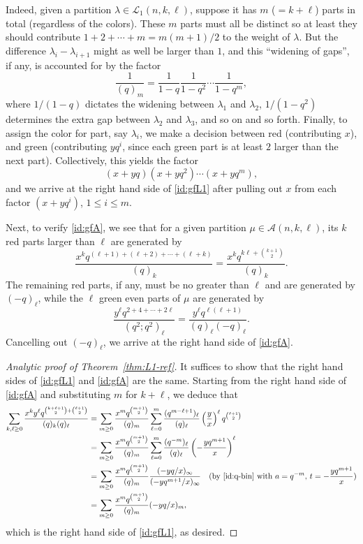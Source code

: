 \documentclass[11pt,reqno]{amsart}
\numberwithin{equation}{section}
\theoremstyle{plain}
\theoremstyle{definition}
\newcommand{\A}{\mathcal{A}}
\renewcommand{\L}{\mathcal{L}}
\begin{document}
Indeed, given a partition $\lambda\in\L_1(n,k,\ell)$, suppose it has $m$ ($=k+\ell$) parts in total (regardless of the colors). These $m$ parts must all be distinct so at least they should contribute $1+2+\cdots+m=m(m+1)/2$ to the weight of $\lambda$. But the difference $\lambda_i-\lambda_{i+1}$ might as well be larger than $1$, and this ``widening of gaps'', if any, is accounted for by the factor
$$\frac{1}{(q)_m}=\frac{1}{1-q}\frac{1}{1-q^2}\cdots\frac{1}{1-q^m},$$
where $1/(1-q)$ dictates the widening between $\lambda_1$ and $\lambda_2$, $1/(1-q^2)$ determines the extra gap between $\lambda_2$ and $\lambda_3$, and so on and so forth. Finally, to assign the color for part, say $\lambda_i$, we make a decision between red (contributing $x$), and green (contributing $yq^i$, since each green part is at least $2$ larger than the next part). Collectively, this yields the factor
$$(x+yq)(x+yq^2)\cdots(x+yq^m),$$
and we arrive at the right hand side of \eqref{id:gfL1} after pulling out $x$ from each factor $(x+yq^i)$, $1\le i\le m$.

Next, to verify \eqref{id:gfA}, we see that for a given partition $\mu\in\A(n,k,\ell)$, its $k$ red parts larger than $\ell$ are generated by
$$\frac{x^kq^{(\ell+1)+(\ell+2)+\cdots+(\ell+k)}}{(q)_k}=\frac{x^kq^{k\ell+\binom{k+1}{2}}}{(q)_k}.$$
The remaining red parts, if any, must be no greater than $\ell$ and are generated by $(-q)_{\ell}$, while the $\ell$ green even parts of $\mu$ are generated by
$$\frac{y^{\ell}q^{2+4+\cdots+2\ell}}{(q^2;q^2)_{\ell}}=\frac{y^{\ell}q^{\ell(\ell+1)}}{(q)_{\ell}(-q)_{\ell}}.$$
Cancelling out $(-q)_{\ell}$, we arrive at the right hand side of \eqref{id:gfA}.

\begin{proof}[Analytic proof of Theorem~\ref{thm:L1-ref}]
It suffices to show that the right hand sides of \eqref{id:gfL1} and \eqref{id:gfA} are the same. Starting from the right hand side of \eqref{id:gfA} and substituting $m$ for $k+\ell$, we deduce that
\begin{align*}
\sum_{k,\ell\ge 0}\frac{x^k y^{\ell}q^{\binom{k+\ell+1}{2}+\binom{\ell+1}{2}}}{(q)_k(q)_{\ell}} &= \sum_{m\ge 0}\frac{x^mq^{\binom{m+1}{2}}}{(q)_m}\sum_{\ell=0}^{m}\frac{(q^{m-\ell+1})_{\ell}}{(q)_{\ell}}\left(\frac{y}{x}\right)^{\ell}q^{\binom{\ell+1}{2}}\\
&= \sum_{m\ge 0}\frac{x^mq^{\binom{m+1}{2}}}{(q)_m}\sum_{\ell=0}^m \frac{(q^{-m})_{\ell}}{(q)_{\ell}}\left(-\frac{yq^{m+1}}{x}\right)^{\ell}\\
&= \sum_{m\ge 0}\frac{x^mq^{\binom{m+1}{2}}}{(q)_m}\frac{(-yq/x)_{\infty}}{(-yq^{m+1}/x)_{\infty}}\quad \text{(by \eqref{id:q-bin} with $a=q^{-m}$, $t=-\frac{yq^{m+1}}{x}$)}\\
&= \sum_{m\ge 0}\frac{x^mq^{\binom{m+1}{2}}}{(q)_m}(-yq/x)_{m},
\end{align*}
which is the right hand side of \eqref{id:gfL1}, as desired.
\end{proof}
\end{document}
